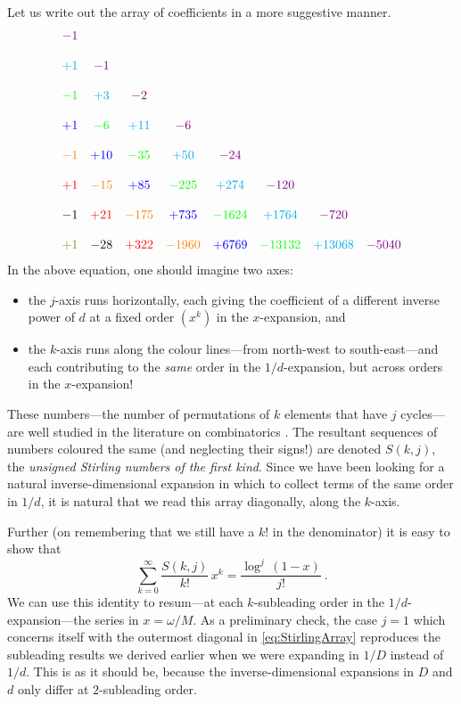 \documentclass[a4paper,11pt]{article}
\newcommand{\violet}{\textcolor{violet}}
\newcommand{\cyan}{\textcolor{cyan}}
\newcommand{\blue}{\textcolor{blue}}
\newcommand{\green}{\textcolor{green}}
\newcommand{\olive}{\textcolor{olive}}
\newcommand{\orange}{\textcolor{orange}}
\newcommand{\red}{\textcolor{red}}
\begin{document}
Let us write out the array of coefficients in a more suggestive manner.
\begin{equation}
\label{eq:StirlingArray}
\begin{matrix}
\violet{-1} \\ \\
\cyan{+1} & \violet{-1} \\ \\ 
\green{-1} & \cyan{+3} & \violet{-2} \\ \\
\blue{+1} & \green{-6} & \cyan{+11} & \violet{-6} \\ \\
\orange{-1} & \blue{+10} & \green{-35} & \cyan{+50} & \violet{-24} \\ \\
\red{+1} & \orange{-15} & \blue{+85} & \green{-225} & \cyan{+274} & \violet{-120} \\ \\
-1 & \red{+21} & \orange{-175} & \blue{+735} & \green{-1624} & \cyan{+1764} & \violet{-720} \\ \\
\olive{+1} & -28 & \red{+322} & \orange{-1960} & \blue{+6769} & \green{-13132} & \cyan{+13068} & \violet{-5040}  
\end{matrix}
\end{equation}
In the above equation, one should imagine two axes:
\begin{itemize}
    \item the $j$-axis runs horizontally, each giving the coefficient of a different inverse power of $d$ at a fixed order $(x^k)$ in the $x$-expansion, and
    \item the $k$-axis runs along the colour lines---from north-west to south-east---and each contributing to the \emph{same} order in the $1/d$-expansion, but across orders in the $x$-expansion!
\end{itemize}
These numbers---the number of permutations of $k$ elements that have $j$ cycles---are well studied in the literature on combinatorics \cite{Graham:1994}. The resultant sequences of numbers coloured the same (and neglecting their signs!) are denoted $S(k,j)$, the \emph{unsigned Stirling numbers of the first kind}. Since we have been looking for a natural inverse-dimensional expansion in which to collect terms of the same order in $1/d$, it is natural that we read this array diagonally, along the $k$-axis.

Further (on remembering that we still have a $k!$ in the denominator) it is easy to show that 
\begin{equation}
\sum_{k = 0}^{\infty} \frac{S(k,j)}{k!} \, x^k = \frac{\log^j \,(1-x)}{j!} \ .
\end{equation}
We can use this identity to resum---at each $k$-subleading order in the $1/d$-expansion---the series in $x = \omega/M$. As a preliminary check, the case $j = 1$ which concerns itself with the outermost diagonal in \eqref{eq:StirlingArray} reproduces the subleading results we derived earlier when we were expanding in $1/D$ instead of $1/d$. This is as it should be, because the inverse-dimensional expansions in $D$ and $d$ only differ at $2$-subleading order.
\end{document}
